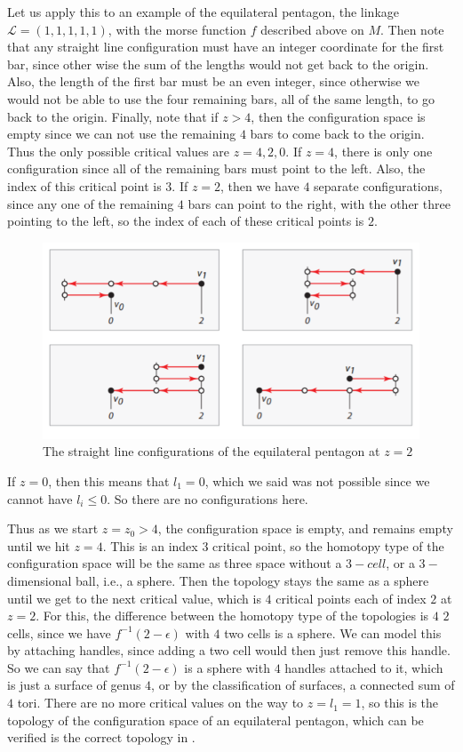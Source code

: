 \documentclass{article}
\begin{document}
Let us apply this to an example of the equilateral pentagon, the linkage $\mathcal{L} = (1, 1, 1, 1, 1)$, with the morse function $f$ described above on $M$. Then note that any straight line configuration must have an integer coordinate for the first bar, since other wise the sum of the lengths would not get back to the origin. Also, the length of the first bar must be an even integer, since otherwise we would not be able to use the four remaining bars, all of the same length, to go back to the origin. Finally, note that if $z > 4$, then the configuration space is empty since we can not use the remaining $4$ bars to come back to the origin. Thus the only possible critical values are $z = 4, 2, 0$. If $z = 4$, there is only one configuration since all of the remaining bars must point to the left. Also, the index of this critical point is $3$. If $z = 2$, then we have $4$ separate configurations, since any one of the remaining $4$ bars can point to the right, with the other three pointing to the left, so the index of each of these critical points is $2$.
\begin{figure}[!ht]
    \centering
    \includegraphics[scale = .5]{z2.png}
    \caption{The straight line configurations of the equilateral pentagon at $z = 2$ \cite{rourke}}
    \label{fig:z2}
\end{figure} 
If $z = 0$, then this means that $l_1 = 0$, which we said was not possible since we cannot have $l_i \leq 0$. So there are no configurations here. 

Thus as we start $z = z_0 > 4$, the configuration space is empty, and remains empty until we hit $z = 4$. This is an index $3$ critical point, so the homotopy type of the configuration space will be the same as three space without a $3-cell$, or a $3-$ dimensional ball, i.e., a sphere. Then the topology stays the same as a sphere until we get to the next critical value, which is $4$ critical points each of index $2$ at $z = 2$. For this, the difference between the homotopy type of the topologies is $4$ $2$ cells, since we have $f^{-1}(2 - \epsilon)$ with $4$ two cells is a sphere. We can model this by attaching handles, since adding a two cell would then just remove this handle. So we can say that $f^{-1}(2 - \epsilon)$ is a sphere with $4$ handles attached to it, which is just a surface of genus $4$, or by the classification of surfaces, a connected sum of $4$ tori. There are no more critical values on the way to $z = l_1 = 1$, so this is the topology of the configuration space of an equilateral pentagon, which can be verified is the correct topology in \cite{planar}. 
\end{document}
